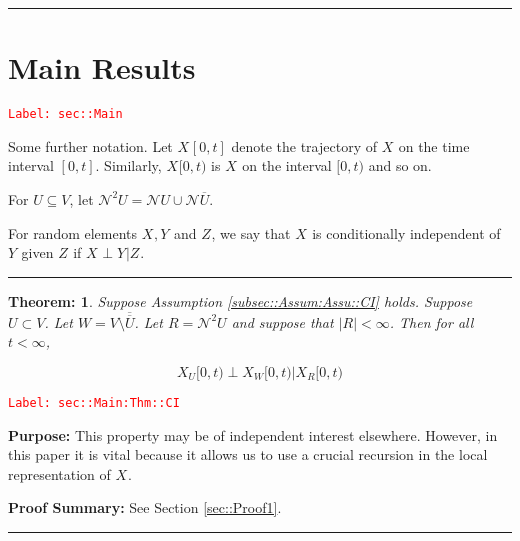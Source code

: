 \documentclass[12pt]{article}
\newcommand{\mc}{\mathcal}
\newcommand{\ov}{\overline}
\newcommand{\tr}{\textcolor{red}}
\newcommand{\labe}[1]{\tr{\texttt{Label: #1}}}
\newcommand{\purpose}{\textbf{Purpose: }}
\newcommand{\pfsum}{\textbf{Proof Summary: }}
\newcommand{\ind}{\hspace{24pt}}
\newcommand{\lin}{\rule{\linewidth}{0.4 pt}}
\newcommand{\neigh}{\mc{N}}					%
\newcommand{\dneigh}{\mc{N}^2}				%
\renewcommand{\U}{U}							%
\newcommand{\UU}{W}								%
\newcommand{\UUU}{R}							%
\renewcommand{\t}{t}							%
\newcommand{\V}{V}									%
\newcommand{\rxvts}[2]{X_{#1}{#2}}					%
\newcommand{\rxvtts}[2]{Y_{#1}{#2}}					%
\newcommand{\rxvttts}[2]{Z_{#1}{#2}}				%
\newtheorem{thms}{Theorem: }[section]
\begin{document}
\lin
\section{Main Results}
\label{sec::Main}\labe{sec::Main}

Some further notation. Let \(\rxvts{}{[0,\t]}\) denote the trajectory of \(\rxvts{}{}\) on the time interval \([0,\t]\). Similarly, \(\rxvts{}{[0,\t)}\) is \(\rxvts{}{}\) on the interval \([0,\t)\) and so on.

\ind For \(\U \subseteq \V\), let \(\dneigh{\U} = \neigh{\U} \cup \neigh{\ov{\U}}\). 

\ind For random elements \(\rxvts{}{},\rxvtts{}{}\) and \(\rxvttts{}{}\), we say that \(\rxvts{}{}\) is conditionally independent of \(\rxvtts{}{}\) given \(\rxvttts{}{}\) if \(\rxvts{}{}\perp\rxvtts{}{}|\rxvttts{}{}\).

\lin

\begin{thms}
Suppose Assumption \ref{subsec::Assum:Assu::CI} holds. Suppose \(\U \subset \V\). Let \(\UU = \V\setminus \ov{\ov{\U}}\). Let \(\UUU= \dneigh{U}\) and suppose that \(|\UUU| < \infty\). Then for all \(\t < \infty\),

\[\rxvts{\U}{[0,\t)}\perp \rxvts{\UU}{[0,\t)}|\rxvts{\UUU}{[0,\t)}\]
\label{sec::Main:Thm::CI}
\end{thms}
\labe{sec::Main:Thm::CI}

\purpose This property may be of independent interest elsewhere. However, in this paper it is vital because it allows us to use a crucial recursion in the local representation of \(\rxvts{}{}\).

\pfsum See Section \ref{sec::Proof1}.

\lin
\end{document}
